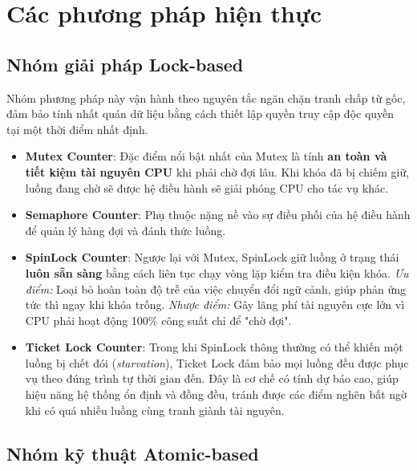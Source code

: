 \newpage

\section{Các phương pháp hiện thực}

\subsection{Nhóm giải pháp Lock-based}

Nhóm phương pháp này vận hành theo nguyên tắc ngăn chặn tranh chấp từ gốc, đảm bảo tính nhất quán dữ liệu bằng cách thiết lập quyền truy cập độc quyền tại một thời điểm nhất định.

\begin{itemize}
    \item \textbf{Mutex Counter}: 
    Đặc điểm nổi bật nhất của Mutex là tính \textbf{an toàn và tiết kiệm tài nguyên CPU} khi phải chờ đợi lâu. Khi khóa đã bị chiếm giữ, luồng đang chờ sẽ được hệ điều hành sẽ giải phóng CPU cho tác vụ khác. 
    \item \textbf{Semaphore Counter}: 
    Phụ thuộc nặng nề vào sự điều phối của hệ điều hành để quản lý hàng đợi và đánh thức luồng.

    \item \textbf{SpinLock Counter}: 
    Ngược lại với Mutex, SpinLock giữ luồng ở trạng thái \textbf{luôn sẵn sàng} bằng cách liên tục chạy vòng lặp kiểm tra điều kiện khóa. 
    \textit{Ưu điểm:} Loại bỏ hoàn toàn độ trễ của việc chuyển đổi ngữ cảnh, giúp phản ứng tức thì ngay khi khóa trống. 
    \textit{Nhược điểm:} Gây lãng phí tài nguyên cực lớn vì CPU phải hoạt động 100\% công suất chỉ để "chờ đợi". 
    
    \item \textbf{Ticket Lock Counter}: 
Trong khi SpinLock thông thường có thể khiến một luồng bị chết đói (\textit{starvation}), Ticket Lock đảm bảo mọi luồng đều được phục vụ theo đúng trình tự thời gian đến. Đây là cơ chế có tính dự báo cao, giúp hiệu năng hệ thống ổn định và đồng đều, tránh được các điểm nghẽn bất ngờ khi có quá nhiều luồng cùng tranh giành tài nguyên.
\end{itemize}

\subsection{Nhóm kỹ thuật Atomic-based}

